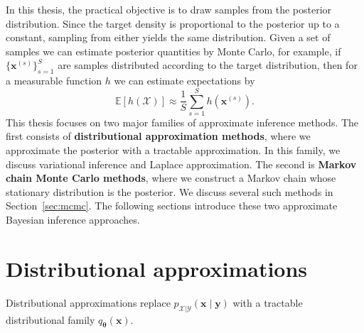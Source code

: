 In this thesis, the practical objective is to draw samples from the posterior distribution. Since the target density is proportional to the posterior up to a constant, sampling from either yields the same distribution. Given a set of samples we can estimate posterior quantities by Monte Carlo, for example,  if $\{\boldsymbol{x}^{(s)}\}_{s=1}^S$ are samples distributed according to the target distribution, then for a measurable function $h$ we can estimate expectations by
\begin{equation}
    \mathbb{E}\!\left[h(\mathcal{X})\right] \approx \frac{1}{S}\sum_{s=1}^{S} h\!\left(\boldsymbol{x}^{(s)}\right).
\end{equation}
This thesis focuses on two major families of approximate inference methods. The first consists of \textbf{distributional approximation methods}, where we approximate the posterior with a tractable approximation. In this family, we discuss variational inference and Laplace approximation. The second is \textbf{Markov chain Monte Carlo methods}, where we construct a Markov chain whose stationary distribution is the posterior. We discuss several such methods in Section~\ref{sec:mcmc}. The following sections introduce these two approximate Bayesian inference approaches. 


\section{Distributional approximations}
Distributional approximations replace $p_{\mathcal{X}|\mathcal{Y}}(\boldsymbol{x}\mid \boldsymbol{y})$ with a tractable distributional family $q_{\boldsymbol{\theta}}(\boldsymbol{x})$.

